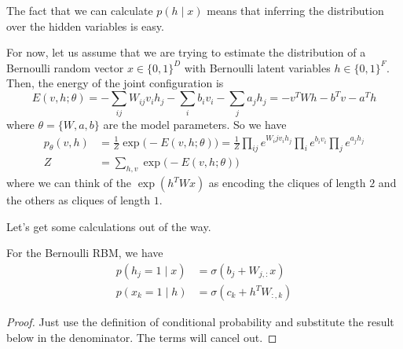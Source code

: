   The fact that we can calculate $p(h \mid x)$ means that inferring the distribution over the hidden variables is easy. 

  \begin{definition}
    For now, let us assume that we are trying to estimate the distribution of a Bernoulli random vector $x \in \{0, 1\}^D$ with Bernoulli latent variables $h \in \{0, 1\}^F$. Then, the energy of the joint configuration is  
    \begin{equation}
      E(v, h; \theta) = - \sum_{ij} W_{ij} v_i h_j - \sum_i b_i v_i - \sum_j a_j h_j = - v^T W h - b^T v - a^T h
    \end{equation}
    where $\theta = \{W, a, b\}$ are the model parameters. So we have 
    \begin{align} 
      p_{\theta} (v, h) & = \frac{1}{Z} \exp \big( -E (v, h; \theta)\big) = \frac{1}{Z} \prod_{ij} e^{W_ij v_i h_j} \prod_i e^{b_i v_i} \prod_j e^{a_j h_j} \\
      Z & = \sum_{h, v} \exp \big( -E(v, h; \theta) \big) 
    \end{align}
    where we can think of the $\exp(h^T W x)$ as encoding the cliques of length $2$ and the others as cliques of length $1$.  
  \end{definition}

  Let's get some calculations out of the way. 

  \begin{lemma} 
    For the Bernoulli RBM, we have 
    \begin{align} 
      p(h_j = 1 \mid x) & = \sigma ( b_j + W_{j,:} x) \\
      p(x_k = 1 \mid h) & = \sigma ( c_k + h^T W_{:, k})
    \end{align}
  \end{lemma}
  \begin{proof}
    Just use the definition of conditional probability and substitute the result below in the denominator. The terms will cancel out. 
  \end{proof}

